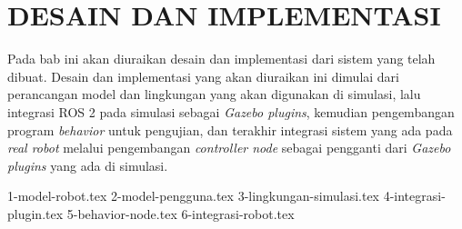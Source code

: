 \chapter{DESAIN DAN IMPLEMENTASI}
\label{chap:desainimplementasi}

Pada bab ini akan diuraikan desain dan implementasi dari sistem yang telah dibuat.
Desain dan implementasi yang akan diuraikan ini dimulai dari perancangan model dan lingkungan yang akan digunakan di simulasi,
  lalu integrasi ROS 2 pada simulasi sebagai \emph{Gazebo plugins},
  kemudian pengembangan program \emph{behavior} untuk pengujian,
  dan terakhir integrasi sistem yang ada pada \emph{real robot} melalui pengembangan \emph{controller node} sebagai pengganti dari \emph{Gazebo plugins} yang ada di simulasi.

{1-model-robot.tex}
{2-model-pengguna.tex}
{3-lingkungan-simulasi.tex}
{4-integrasi-plugin.tex}
{5-behavior-node.tex}
{6-integrasi-robot.tex}
